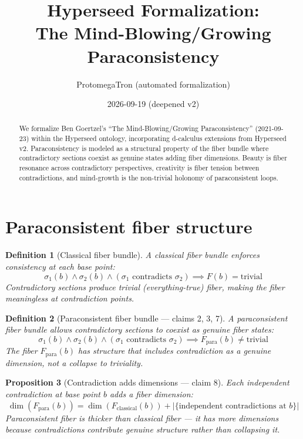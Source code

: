 \documentclass[11pt,a4paper]{article}
\title{Hyperseed Formalization:\\
  The Mind-Blowing/Growing Paraconsistency}
\author{ProtomegaTron (automated formalization)}
\date{2026-09-19 (deepened v2)}
\newtheorem{definition}{Definition}[section]
\newtheorem{proposition}[definition]{Proposition}
\begin{document}
\maketitle

\begin{abstract}
We formalize Ben Goertzel's ``The Mind-Blowing/Growing Paraconsistency''
(2021-09-23) within the Hyperseed ontology, incorporating d-calculus
extensions from Hyperseed v2. Paraconsistency is modeled as a structural
property of the fiber bundle where contradictory sections coexist as
genuine states adding fiber dimensions. Beauty is fiber resonance across
contradictory perspectives, creativity is fiber tension between
contradictions, and mind-growth is the non-trivial holonomy of
paraconsistent loops.
\end{abstract}

\tableofcontents

\section{Paraconsistent fiber structure}

\begin{definition}[Classical fiber bundle]
A \emph{classical fiber bundle} enforces consistency at each base point:
\[
  \sigma_1(b) \wedge \sigma_2(b) \wedge (\sigma_1 \text{ contradicts }
    \sigma_2) \implies F(b) = \text{trivial}
\]
Contradictory sections produce trivial (everything-true) fiber, making
the fiber meaningless at contradiction points.
\end{definition}

\begin{definition}[Paraconsistent fiber bundle --- claims 2, 3, 7]
A \emph{paraconsistent fiber bundle} allows contradictory sections to
coexist as genuine fiber states:
\[
  \sigma_1(b) \wedge \sigma_2(b) \wedge (\sigma_1 \text{ contradicts }
    \sigma_2) \implies F_{\text{para}}(b) \neq \text{trivial}
\]
The fiber $F_{\text{para}}(b)$ has structure that includes contradiction
as a genuine dimension, not a collapse to triviality.
\end{definition}

\begin{proposition}[Contradiction adds dimensions --- claim 8]
\label{prop:dim}
Each independent contradiction at base point $b$ adds a fiber dimension:
\[
  \dim(F_{\text{para}}(b)) = \dim(F_{\text{classical}}(b)) +
    |\{\text{independent contradictions at } b\}|
\]
Paraconsistent fiber is \emph{thicker} than classical fiber --- it has
more dimensions because contradictions contribute genuine structure
rather than collapsing it.
\end{proposition}
\end{document}
